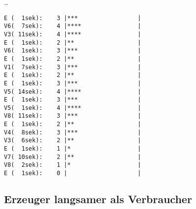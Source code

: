 \begin{quellcode}[H]
\begin{scriptsize}
\begin{spacing}{1.0}
…

\begin{verbatim}
E (  1sek):    3 |***                 |
V6(  7sek):    4 |****                |
V3( 11sek):    4 |****                |
E (  1sek):    2 |**                  |
V6(  1sek):    3 |***                 |
E (  1sek):    2 |**                  |
V1(  7sek):    3 |***                 |
E (  1sek):    2 |**                  |
E (  1sek):    3 |***                 |
V5( 14sek):    4 |****                |
E (  1sek):    3 |***                 |
V5(  1sek):    4 |****                |
V8( 11sek):    3 |***                 |
E (  1sek):    2 |**                  |
V4(  8sek):    3 |***                 |
V3(  6sek):    2 |**                  |
E (  1sek):    1 |*                   |
V7( 10sek):    2 |**                  |
V8(  2sek):    1 |*                   |
E (  1sek):    0 |                    |
\end{verbatim}
\caption{Erzeuger wartet 1 ZE, 8 zufällige Verbraucher}
\label{out:esv2}
\end{spacing}
\end{scriptsize}
\end{quellcode}


\subsection{Erzeuger langsamer als Verbraucher} %
